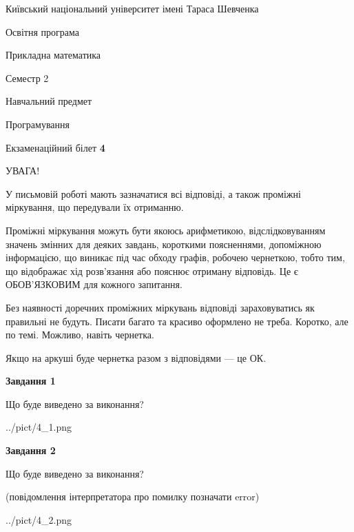 \documentclass[12pt, ukrainian]{article}
\begin{document}
{{\begin {small}\par
{ \center  Київський національний університет імені Тараса Шевченка \par}
{\parbox {5 cm}{Освітня програма \hfill}{\parbox {7 cm}{Прикладна математика\hfill}}\parbox {6 cm}{\hfill Семестр 2}}\par
{\parbox {5 cm} {Навчальний предмет \hfill}\parbox {7 cm}{Програмування \hfill}\parbox {6cm}{\hfill}\par}\vspace{-7pt} \end{small}}{\center Екзаменаційний білет \No \textbf
{ 4 }\par}}
{
\begin {large}
УВАГА!

У письмовій роботі мають зазначатися всі відповіді, а також проміжні міркування, що передували їх отриманню.

Проміжні міркування можуть бути якоюсь арифметикою, відслідковуванням зна\-чень змінних для деяких завдань,
короткими поясненнями, допоміжною інформацією, що виникає під час обходу графів, робочею чернеткою,
тобто тим, що відображає хід розв’язання або пояснює отриману відповідь.
Це є ОБОВ’ЯЗКОВИМ для кожного запитання.

Без наявності доречних проміжних міркувань відповіді зараховуватись як правиль\-ні не будуть.
Писати багато та красиво оформлено не треба. Коротко, але по темі. Можли\-во, навіть чернетка.

Якщо на аркуші буде чернетка разом з відповідями --- це ОК.

\newpage

{\begin {center}\textbf{Завдання 1}\end {center}}\par
Що буде виведено за виконання?\par
\begin{center}
	{../pict/4_1.png}
\end{center}
\newpage

{\begin {center}\textbf{Завдання 2}\end {center}}\par
Що буде виведено за виконання?\par
 (повідомлення інтерпретатора про помилку позначати error)\par
\begin{center}
	{../pict/4_2.png}
\end{center}
\newpage


\end{large}}
\end{document}
